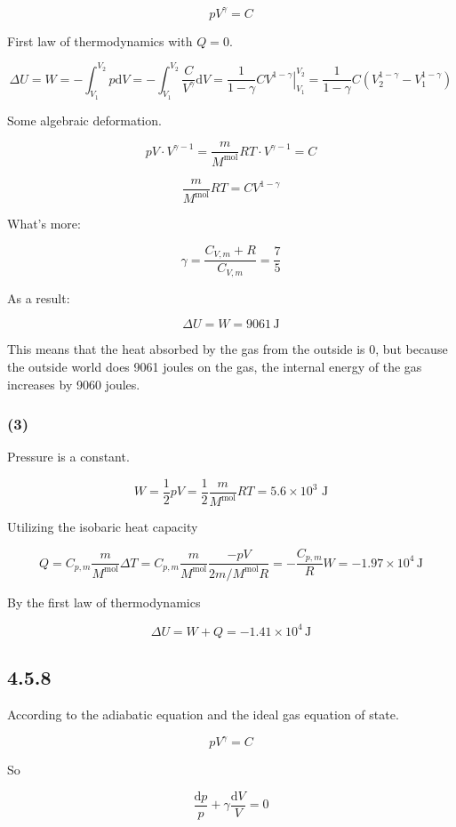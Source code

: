 \documentclass[a4paper,11pt]{amsart}
\theoremstyle{definition}
\begin{document}
	$$
	pV^{\gamma}=C
	$$
	
	First law of thermodynamics with $Q=0$.
	
	$$
	\Delta U=W=-\int_{V_1}^{V_2}{p\mathrm{d}V}=-\int_{V_1}^{V_2}{\frac{C}{V^{\gamma}}\mathrm{d}V=\frac{1}{1-\gamma}C}\left. V^{1-\gamma} \right|_{V_1}^{V_2}=\frac{1}{1-\gamma}C\left( V_{2}^{1-\gamma}-V_{1}^{1-\gamma} \right) 
	$$
	
	Some algebraic deformation.
	
	$$
	pV\cdot V^{\gamma -1}=\frac{m}{M^{\mathrm{mol}}}RT\cdot V^{\gamma -1}=C
	$$
	
	$$
	\frac{m}{M^{\mathrm{mol}}}RT=CV^{1-\gamma}
	$$
	
	What's more:
	
	$$
	\gamma =\frac{C_{V,m}+R}{C_{V,m}}=\frac{7}{5}
	$$
	
	As a result:
	
	$$
	\Delta U=W=9061\,\mathrm{J}
	$$
	
	This means that the heat absorbed by the gas from the outside is 0, but because the outside world does 9061 joules on the gas, the internal energy of the gas increases by 9060 joules. 
	
	\subsubsection*{(3)}
	
	Pressure is a constant.
	
	$$
	W=\frac{1}{2}pV=\dfrac{1}{2}\dfrac{m}{M^{\mathrm{mol}}}RT=5.6\times 10^3\,\,\mathrm{J}
	$$
	
	Utilizing the isobaric heat capacity
	
	$$
	Q=C_{p,m}\frac{m}{M^{\mathrm{mol}}}\Delta T=C_{p,m}\frac{m}{M^{\mathrm{mol}}}\frac{-pV}{2m/M^{\mathrm{mol}}R}=-\frac{C_{p,m}}{R}W=-1.97\times 10^4\,\mathrm{J}
	$$
	
	By the first law of thermodynamics
	
	$$
	\Delta U=W+Q=-1.41\times 10^4\,\mathrm{J}
	$$
	
	\subsection*{4.5.8}
	
	According to the adiabatic equation and the ideal gas equation of state.
	
	$$
	pV^{\gamma}=C
	$$
	
	So
	
	$$
	\frac{\mathrm{d}p}{p}+\gamma \frac{\mathrm{d}V}{V}=0
	$$
	
\end{document}
